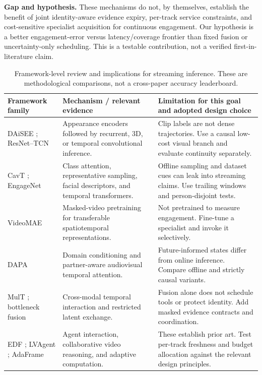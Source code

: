 \documentclass[a4paper,conference]{IEEEtran}
\begin{document}
\textbf{Gap and hypothesis.} These mechanisms do not, by themselves, establish the benefit of joint identity-aware evidence expiry, per-track service constraints, and cost-sensitive specialist acquisition for continuous engagement. Our hypothesis is a better engagement-error versus latency/coverage frontier than fixed fusion or uncertainty-only scheduling. This is a testable contribution, not a verified first-in-literature claim.

\begin{table}[t]
\caption{Framework-level review and implications for streaming inference. These are methodological comparisons, not a cross-paper accuracy leaderboard.}
\label{tab:review}\centering\footnotesize
\begin{tabular}{p{}p{}p{}}
\toprule
Framework family & Mechanism / relevant evidence & Limitation for this goal and adopted design choice\\
\midrule
DAiSEE \cite{daisee}; ResNet--TCN \cite{tcn} & Appearance encoders followed by recurrent, 3D, or temporal convolutional inference. & Clip labels are not dense trajectories. Use a causal low-cost visual branch and evaluate continuity separately.\\
CavT \cite{cavt}; EngageNet \cite{engagenet} & Class attention, representative sampling, facial descriptors, and temporal transformers. & Offline sampling and dataset cues can leak into streaming claims. Use trailing windows and person-disjoint tests.\\
VideoMAE \cite{videomae} & Masked-video pretraining for transferable spatiotemporal representations. & Not pretrained to measure engagement. Fine-tune a specialist and invoke it selectively.\\
DAPA \cite{dapa} & Domain conditioning and partner-aware audiovisual temporal attention. & Future-informed states differ from online inference. Compare offline and strictly causal variants.\\
MulT \cite{mult}; bottleneck fusion \cite{mbt} & Cross-modal temporal interaction and restricted latent exchange. & Fusion alone does not schedule tools or protect identity. Add masked evidence contracts and coordination.\\
EDF \cite{edf}; LVAgent \cite{lvagent}; AdaFrame \cite{adaframe} & Agent interaction, collaborative video reasoning, and adaptive computation. & These establish prior art. Test per-track freshness and budget allocation against the relevant design principles.\\
\bottomrule
\end{tabular}
\end{table}
\end{document}
